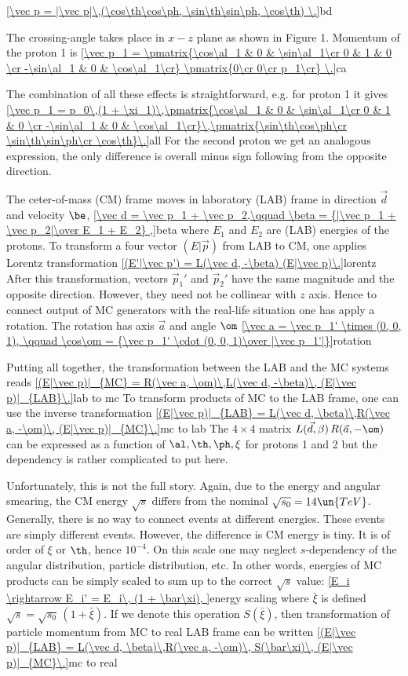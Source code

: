 \eqref{\vec p = |\vec p|\,(\cos\th\cos\ph, \sin\th\sin\ph, \cos\th) \.}{bd}

The crossing-angle takes place in $x-z$ plane as shown in Figure 1. Momentum of the proton 1 is
\eqref{\vec p_1 = \pmatrix{\cos\al_1 & 0 & \sin\al_1\cr 0 & 1 & 0 \cr -\sin\al_1 & 0 & \cos\al_1\cr} \pmatrix{0\cr 0\cr p_1\cr} \.}{ca}

The combination of all these effects is straightforward, e.g. for proton 1 it gives
\eqref{\vec p_1 = p_0\,(1 + \xi_1)\,\pmatrix{\cos\al_1 & 0 & \sin\al_1\cr 0 & 1 & 0 \cr -\sin\al_1 & 0 & \cos\al_1\cr}\,\pmatrix{\sin\th\cos\ph\cr \sin\th\sin\ph\cr \cos\th}\.}{all}
For the second proton we get an analogous expression, the only difference is overall minus sign following from the opposite direction.

The ceter-of-mass (CM) frame moves in laboratory (LAB) frame in direction $\vec d$ and velocity $\be$,
\eqref{\vec d = \vec p_1 + \vec p_2,\qquad \beta = {|\vec p_1 + \vec p_2|\over E_1 + E_2} ,}{beta}
where $E_1$ and $E_2$ are (LAB) energies of the protons. To transform a four vector $(E| \vec p)$ from LAB to CM, one applies Lorentz transformation
\eqref{(E'|\vec p') = L(\vec d, -\beta) (E|\vec p)\.}{lorentz}
After this transformation, vectors $\vec p_1'$ and $\vec p_2'$ have the same magnitude and the opposite direction. However, they need not be collinear with $z$ axis. Hence to connect output of MC generators with the real-life situation one has apply a rotation. The rotation has axis $\vec a$ and angle $\om$
\eqref{\vec a = \vec p_1' \times (0, 0, 1), \qquad \cos\om = {\vec p_1' \cdot (0, 0, 1)\over |\vec p_1'|}}{rotation}

Putting all together, the transformation between the LAB and the MC systems reads
\eqref{(E|\vec p)|_{MC} = R(\vec a, \om)\,L(\vec d, -\beta)\, (E|\vec p)|_{LAB}\.}{lab to mc}
To transform products of MC to the LAB frame, one can use the inverse transformation
\eqref{(E|\vec p)|_{LAB} = L(\vec d, \beta)\,R(\vec a, -\om)\, (E|\vec p)|_{MC}\.}{mc to lab}
The $4\times4$ matrix $L(\vec d, \beta)\,R(\vec a, -\om)$ can be expressed as a function of $\al, \th, \ph, \xi$ for protons 1 and 2 but the dependency is rather complicated to put here.

Unfortunately, this is not the full story. Again, due to the energy and angular smearing, the CM energy $\sqrt{s}$ differs from the nominal $\sqrt{s_0} = 14\un{TeV}$. Generally, there is no way to connect events at different energies. These events are simply different events. However, the difference is CM energy is tiny. It is of order of $\xi$ or $\th$, hence $10^{-4}$. On this scale one may neglect $s$-dependency of the angular distribution, particle distribution, etc. In other words, energies of MC products can be simply scaled to sum up to the correct $\sqrt{s}$ value:
\eqref{E_i \rightarrow E_i' = E_i\, (1 + \bar\xi), }{energy scaling}
where $\bar\xi$ is defined $\sqrt{s} = \sqrt{s_0}\,(1+\bar\xi)$. If we denote this operation $S(\bar\xi)$, then transformation of particle momentum from MC to real LAB frame can be written
\eqref{(E|\vec p)|_{LAB} = L(\vec d, \beta)\,R(\vec a, -\om)\, S(\bar\xi)\, (E|\vec p)|_{MC}\.}{mc to real}

